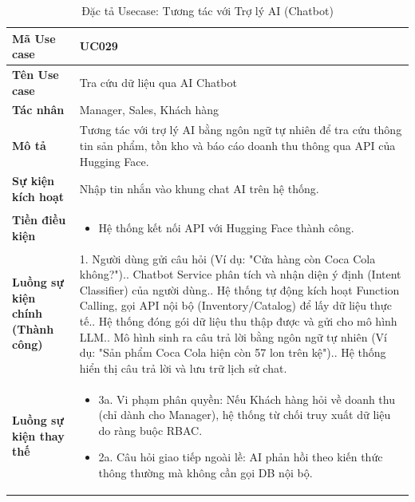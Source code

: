 \documentclass[12pt,a4paper]{report}
\begin{document}
\vspace{0.5cm}

\begin{longtable}{|>{\raggedright\arraybackslash\bfseries}p{4.5cm}|p{11cm}|}
\caption{Đặc tả Usecase: Tương tác với Trợ lý AI (Chatbot)} \label{tab:uc_029} \\
\hline
Mã Use case & UC029 \\ \hline
Tên Use case & Tra cứu dữ liệu qua AI Chatbot \\ \hline
Tác nhân & Manager, Sales, Khách hàng \\ \hline
Mô tả & Tương tác với trợ lý AI bằng ngôn ngữ tự nhiên để tra cứu thông tin sản phẩm, tồn kho và báo cáo doanh thu thông qua API của Hugging Face. \\ \hline
Sự kiện kích hoạt & Nhập tin nhắn vào khung chat AI trên hệ thống. \\ \hline
Tiền điều kiện & 
\begin{itemize}[leftmargin=*, nosep, topsep=0pt, partopsep=0pt]
    \item Hệ thống kết nối API với Hugging Face thành công.
\end{itemize} \\ \hline
Luồng sự kiện chính (Thành công) & 
1. Người dùng gửi câu hỏi (Ví dụ: "Cửa hàng còn Coca Cola không?").\newline
2. Chatbot Service phân tích và nhận diện ý định (Intent Classifier) của người dùng.\newline
3. Hệ thống tự động kích hoạt Function Calling, gọi API nội bộ (Inventory/Catalog) để lấy dữ liệu thực tế.\newline
4. Hệ thống đóng gói dữ liệu thu thập được và gửi cho mô hình LLM.\newline
5. Mô hình sinh ra câu trả lời bằng ngôn ngữ tự nhiên (Ví dụ: "Sản phẩm Coca Cola hiện còn 57 lon trên kệ").\newline
6. Hệ thống hiển thị câu trả lời và lưu trữ lịch sử chat. \\ \hline
Luồng sự kiện thay thế & 
\begin{itemize}[leftmargin=*, nosep, topsep=0pt, partopsep=0pt]
    \item 3a. Vi phạm phân quyền: Nếu Khách hàng hỏi về doanh thu (chỉ dành cho Manager), hệ thống từ chối truy xuất dữ liệu do ràng buộc RBAC.
    \item 2a. Câu hỏi giao tiếp ngoài lề: AI phản hồi theo kiến thức thông thường mà không cần gọi DB nội bộ.
\end{itemize} \\ \hline

\end{longtable}
\end{document}
